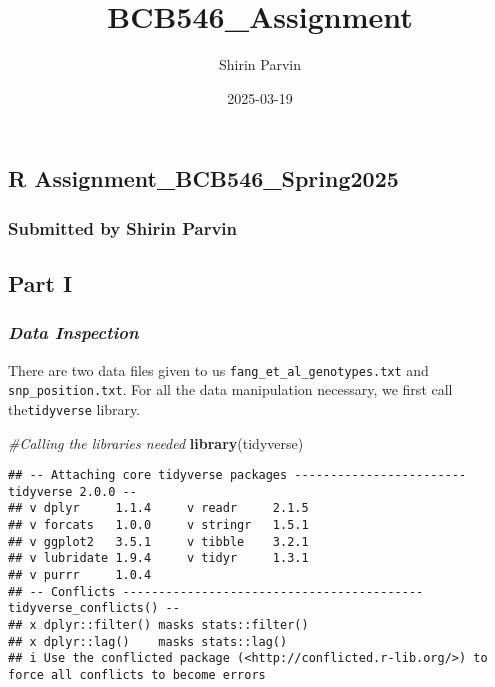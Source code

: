 \documentclass[
]{article}
\title{BCB546\_Assignment}
\author{Shirin Parvin}
\date{2025-03-19}
\newenvironment{Shaded}{\begin{snugshade}}{\end{snugshade}}
\newcommand{\CommentTok}[1]{\textcolor[rgb]{0.56,0.35,0.01}{\textit{#1}}}
\newcommand{\FunctionTok}[1]{\textcolor[rgb]{0.13,0.29,0.53}{\textbf{#1}}}
\newcommand{\NormalTok}[1]{#1}
\begin{document}
\maketitle

\subsection{R
Assignment\_BCB546\_Spring2025}\label{r-assignment_bcb546_spring2025}

\subsubsection{Submitted by Shirin
Parvin}\label{submitted-by-shirin-parvin}

\subsection{Part I}\label{part-i}

\subsubsection{\texorpdfstring{\emph{Data
Inspection}}{Data Inspection}}\label{data-inspection}

There are two data files given to us
\texttt{fang\_et\_al\_genotypes.txt} and \texttt{snp\_position.txt}. For
all the data manipulation necessary, we first call the\texttt{tidyverse}
library.

\begin{Shaded}
\begin{Highlighting}[]
\CommentTok{\#Calling the libraries needed}
\FunctionTok{library}\NormalTok{(tidyverse)}
\end{Highlighting}
\end{Shaded}

\begin{verbatim}
## -- Attaching core tidyverse packages ------------------------ tidyverse 2.0.0 --
## v dplyr     1.1.4     v readr     2.1.5
## v forcats   1.0.0     v stringr   1.5.1
## v ggplot2   3.5.1     v tibble    3.2.1
## v lubridate 1.9.4     v tidyr     1.3.1
## v purrr     1.0.4     
## -- Conflicts ------------------------------------------ tidyverse_conflicts() --
## x dplyr::filter() masks stats::filter()
## x dplyr::lag()    masks stats::lag()
## i Use the conflicted package (<http://conflicted.r-lib.org/>) to force all conflicts to become errors
\end{verbatim}
\end{document}
